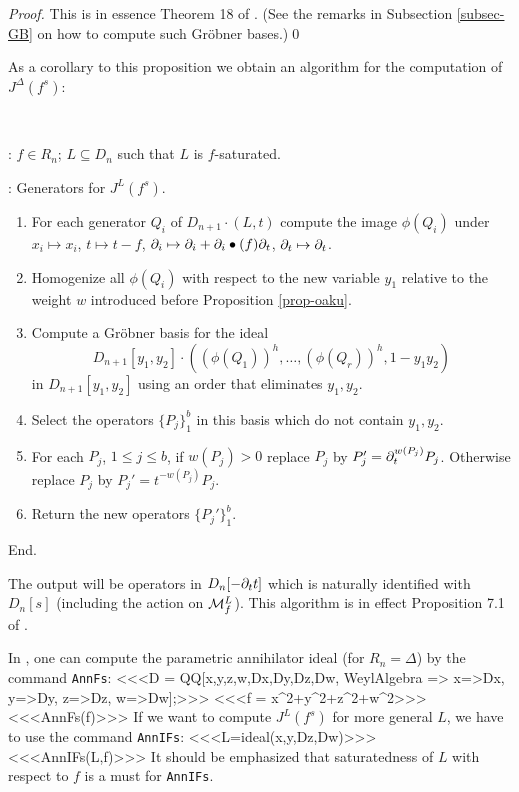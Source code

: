\begin{proof}
This is in essence Theorem 18 of \cite{DM:Oa2}. (See the remarks 
in Subsection \ref{subsec-GB} on how to compute such Gr\"obner
bases.)\qed 
\end{proof}

As a corollary to this proposition we obtain an algorithm for the
computation of $J^\Delta(f^s)$:

\begin{alg}
~

: $f\in R_n$; $L\subseteq D_n$ such that $L$ is 
$f$-saturated.

: Generators for $J^L(f^s)$.

\begin{enumerate}
\item For each generator $Q_i$ of $D_{n+1}\cdot (L,t)$ 
compute the image $\phi(Q_i)$
under $x_i\mapsto
x_i$, $t\mapsto t-f$, $\partial_i\mapsto \partial_i+\partial_i\bullet(f)\partial_t$,
$\partial_t\mapsto\partial_t$.

\item Homogenize all $\phi(Q_i)$ with respect to the new variable
$y_1$ relative to the weight $w$ introduced before Proposition \ref{prop-oaku}.

\item Compute a Gr\"obner basis for the ideal
\[
D_{n+1}[y_1,y_2]\cdot((\phi(Q_1))^h, \ldots, (\phi(Q_r))^h, 1-y_1y_2)
\]
in $D_{n+1}[y_1,y_2]$
using an order that eliminates $y_1,y_2$.

\item Select the operators $\{ P_j\}_1^b$ in this basis which do not
contain $y_1, y_2$. 

\item For each $P_j$, $1\le j\le b$, if $w(P_j)>0$ replace $P_j$ by
$P_j'=\partial_t^{w(P_j)}P_j$. Otherwise replace $P_j$ by
$P_j'=t^{-w(P_j)}P_j$. 

\item Return the new operators $\{P_j'\}_1^b$.
\end{enumerate}
End.
\end{alg}
The output will be operators in $D_n[-\partial_tt]$ which is naturally
identified with $D_n[s]$ (including the action on ${\mathcal M}^L_f$).
This algorithm is in effect Proposition 7.1 of \cite{DM:Oa3}.

In \Mtwo, one can compute the parametric annihilator ideal (for
$R_n=\Delta$) by the command {\tt AnnFs}:
<<<D = QQ[x,y,z,w,Dx,Dy,Dz,Dw, 
       WeylAlgebra => {x=>Dx, y=>Dy, z=>Dz, w=>Dw}];>>>
<<<f = x^2+y^2+z^2+w^2>>>
<<<AnnFs(f)>>>
If we want to compute $J^L(f^s)$ 
for more general $L$, we have to use
the command {\tt AnnIFs}:
<<<L=ideal(x,y,Dz,Dw)>>>
<<<AnnIFs(L,f)>>>
It should be emphasized that saturatedness of $L$ with respect to $f$ is
a must for {\tt AnnIFs}. 


